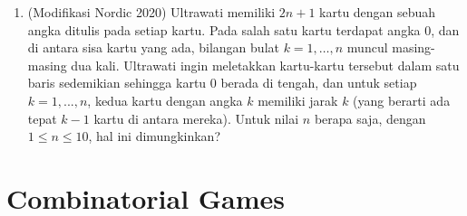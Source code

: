 \documentclass[12pt]{scrartcl}
\begin{document}
\begin{enumerate}[resume]
\item
    (Modifikasi Nordic 2020) Ultrawati memiliki $2n + 1$ kartu dengan sebuah angka ditulis pada setiap kartu. Pada salah satu kartu terdapat angka 0, dan di antara sisa kartu yang ada, bilangan bulat $k = 1, \dots, n$ muncul masing-masing dua kali. Ultrawati ingin meletakkan kartu-kartu tersebut dalam satu baris sedemikian sehingga kartu 0 berada di tengah, dan untuk setiap $k = 1, ..., n$, kedua kartu dengan angka $k$ memiliki jarak $k$ (yang berarti ada tepat $k - 1$ kartu di antara mereka). Untuk nilai $n$ berapa saja, dengan $1 \le n \le 10$, hal ini dimungkinkan?
\end{enumerate}

\section{Combinatorial Games}
\end{document}
